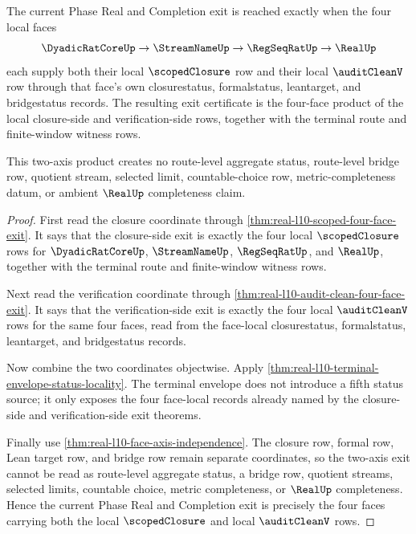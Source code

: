 \begin{theorem}
\label{thm:real-l10-two-axis-four-face-exit}
The current Phase Real and Completion exit is reached exactly when the four
local faces
$$
\DyadicRatCoreUp \to \StreamNameUp \to \RegSeqRatUp \to \RealUp
$$
each supply both their local $\scopedClosure$ row and their local
$\auditCleanV$ row through that face's own closurestatus, formalstatus,
leantarget, and bridgestatus records. The resulting exit certificate is the
four-face product of the local closure-side and verification-side rows,
together with the terminal route and finite-window witness rows.

This two-axis product creates no route-level aggregate status, route-level
bridge row, quotient stream, selected limit, countable-choice row,
metric-completeness datum, or ambient $\RealUp$ completeness claim.
\end{theorem}
\begin{proof}
First read the closure coordinate through
\autoref{thm:real-l10-scoped-four-face-exit}. It says that the closure-side
exit is exactly the four local $\scopedClosure$ rows for
$\DyadicRatCoreUp$, $\StreamNameUp$, $\RegSeqRatUp$, and $\RealUp$, together
with the terminal route and finite-window witness rows.

Next read the verification coordinate through
\autoref{thm:real-l10-audit-clean-four-face-exit}. It says that the
verification-side exit is exactly the four local $\auditCleanV$ rows for the
same four faces, read from the face-local closurestatus, formalstatus,
leantarget, and bridgestatus records.

Now combine the two coordinates objectwise. Apply
\autoref{thm:real-l10-terminal-envelope-status-locality}. The terminal
envelope does not introduce a fifth status source; it only exposes the four
face-local records already named by the closure-side and verification-side
exit theorems.

Finally use \autoref{thm:real-l10-face-axis-independence}. The closure row,
formal row, Lean target row, and bridge row remain separate coordinates, so the
two-axis exit cannot be read as route-level aggregate status, a bridge row,
quotient streams, selected limits, countable choice, metric completeness, or
$\RealUp$ completeness. Hence the current Phase Real and Completion exit is
precisely the four faces carrying both the local $\scopedClosure$ and local
$\auditCleanV$ rows.
\end{proof}
